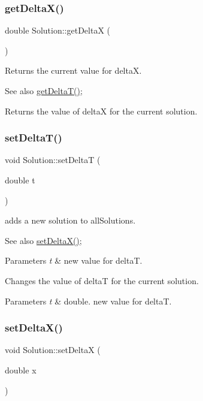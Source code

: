 \subsubsection{\texorpdfstring{get\+Delta\+X()}{getDeltaX()}}
{\footnotesize\ttfamily double Solution\+::get\+DeltaX (\begin{DoxyParamCaption}{ }\end{DoxyParamCaption})}

Returns the current value for deltaX. \begin{DoxySeeAlso}{See also}
\hyperlink{class_solution_ab5e6d31c8b567a20dce17b802242bd02}{get\+Delta\+T()};
\end{DoxySeeAlso}
Returns the value of deltaX for the current solution. \mbox{\label{class_solution_af301d534e2214c1004837350d32569a7}} 
\subsubsection{\texorpdfstring{set\+Delta\+T()}{setDeltaT()}}
{\footnotesize\ttfamily void Solution\+::set\+DeltaT (\begin{DoxyParamCaption}\item[{double}]{t }\end{DoxyParamCaption})}

adds a new solution to all\+Solutions. \begin{DoxySeeAlso}{See also}
\hyperlink{class_solution_a0e651029193eddea478a8f9d68e74355}{set\+Delta\+X()}; 
\end{DoxySeeAlso}

\begin{DoxyParams}{Parameters}
{\em t} & new value for deltaT.\\
\hline
\end{DoxyParams}
Changes the value of deltaT for the current solution. 
\begin{DoxyParams}{Parameters}
{\em t} & double. new value for deltaT. \\
\hline
\end{DoxyParams}
\mbox{\label{class_solution_a0e651029193eddea478a8f9d68e74355}} 
\subsubsection{\texorpdfstring{set\+Delta\+X()}{setDeltaX()}}
{\footnotesize\ttfamily void Solution\+::set\+DeltaX (\begin{DoxyParamCaption}\item[{double}]{x }\end{DoxyParamCaption})}

